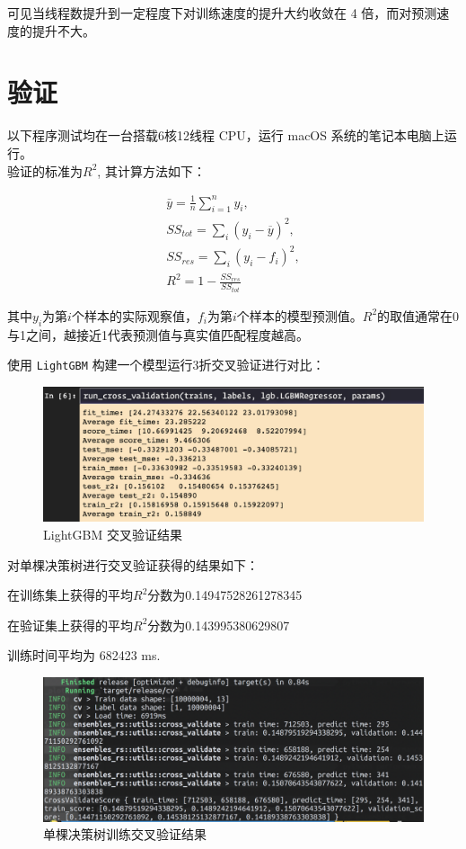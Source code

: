 \documentclass[12pt]{article}
\begin{document}
可见当线程数提升到一定程度下对训练速度的提升大约收敛在 4 倍，而对预测速度的提升不大。

\section{验证}
以下程序测试均在一台搭载6核12线程 CPU，运行 macOS 系统的笔记本电脑上运行。
\\

验证的标准为$R^2$, 其计算方法如下：

\begin{equation}
    \begin{aligned}
    \bar{y}= \frac{1}{n}\sum_{i=1}^n y_i,\\
    SS_{tot} = \sum_i(y_i-\overline{y})^2,\\
    SS_{res} = \sum_i(y_i-f_i)^2,\\
    R^2 = 1 - \frac{SS_{res}}{SS_{tot}}
    \end{aligned}
\end{equation}

其中$y_i$为第$i$个样本的实际观察值，$f_i$为第$i$个样本的模型预测值。$R^2$的取值通常在0与1之间，越接近1代表预测值与真实值匹配程度越高。


使用 \lstinline{LightGBM} \cite{NIPS2017_6907} 构建一个模型运行3折交叉验证进行对比：

\begin{figure}[H]
    \centering
    \includegraphics[scale=0.6]{lgb-baseline.png}
    \caption{LightGBM 交叉验证结果}
    \label{}
\end{figure}

对单棵决策树进行交叉验证获得的结果如下：

在训练集上获得的平均$R^2$分数为0.14947528261278345

在验证集上获得的平均$R^2$分数为0.143995380629807

训练时间平均为 682423 ms.

\begin{figure}[H]
    \centering
    \includegraphics[scale=0.6]{single-tree-cv.png}
    \caption{单棵决策树训练交叉验证结果}
    \label{}
\end{figure}
\end{document}
